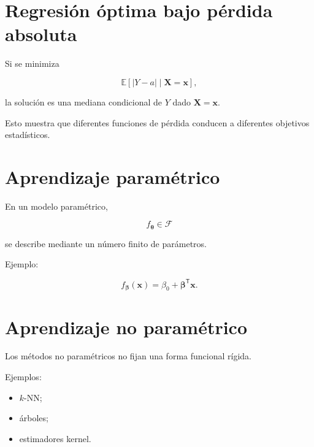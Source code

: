 \documentclass[
  spanish,
  10.5pt,
  letterpaper,
  DIV=11,
  numbers=noendperiod,
  oneside,
  open=any]{scrreprt}
\providecommand{\tightlist}{%
  \setlength{\itemsep}{0pt}\setlength{\parskip}{0pt}}
\theoremstyle{definition}
\theoremstyle{definition}
\theoremstyle{plain}
\theoremstyle{remark}
\begin{document}
\section*{Regresión óptima bajo pérdida
absoluta}\label{regresiuxf3n-uxf3ptima-bajo-puxe9rdida-absoluta}


Si se minimiza

\[
\mathbb{E}
\left[
|Y-a|
\mid
\mathbf{X}=\mathbf{x}
\right],
\]

la solución es una mediana condicional de \(Y\) dado
\(\mathbf{X}=\mathbf{x}\).

Esto muestra que diferentes funciones de pérdida conducen a diferentes
objetivos estadísticos.

\section*{Aprendizaje paramétrico}\label{aprendizaje-paramuxe9trico}


En un modelo paramétrico,

\[
f_{\boldsymbol{\theta}}
\in\mathcal{F}
\]

se describe mediante un número finito de parámetros.

Ejemplo:

\[
f_{\boldsymbol{\beta}}(\mathbf{x})
=
\beta_0
+
\boldsymbol{\beta}^{\mathsf T}\mathbf{x}.
\]

\section*{Aprendizaje no
paramétrico}\label{aprendizaje-no-paramuxe9trico}


Los métodos no paramétricos no fijan una forma funcional rígida.

Ejemplos:

\begin{itemize}
\tightlist
\item
  \(k\)-NN;
\item
  árboles;
\item
  estimadores kernel.
\end{itemize}
\end{document}
